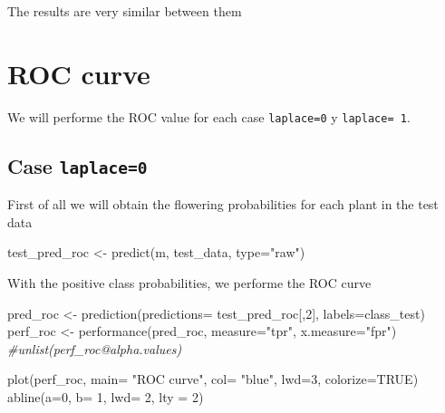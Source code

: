 \documentclass[
]{article}
\newenvironment{Shaded}{\begin{snugshade}}{\end{snugshade}}
\newcommand{\AttributeTok}[1]{\textcolor[rgb]{0.77,0.63,0.00}{#1}}
\newcommand{\CommentTok}[1]{\textcolor[rgb]{0.56,0.35,0.01}{\textit{#1}}}
\newcommand{\ConstantTok}[1]{\textcolor[rgb]{0.00,0.00,0.00}{#1}}
\newcommand{\DecValTok}[1]{\textcolor[rgb]{0.00,0.00,0.81}{#1}}
\newcommand{\FunctionTok}[1]{\textcolor[rgb]{0.00,0.00,0.00}{#1}}
\newcommand{\NormalTok}[1]{#1}
\newcommand{\OtherTok}[1]{\textcolor[rgb]{0.56,0.35,0.01}{#1}}
\newcommand{\StringTok}[1]{\textcolor[rgb]{0.31,0.60,0.02}{#1}}
\begin{document}
The results are very similar between them

\hypertarget{roc-curve}{%
\section{ROC curve}\label{roc-curve}}

We will performe the ROC value for each case \texttt{laplace=0} y
\texttt{laplace=\ 1}.

\hypertarget{case-laplace0}{%
\subsection{\texorpdfstring{Case
\texttt{laplace=0}}{Case laplace=0}}\label{case-laplace0}}

First of all we will obtain the flowering probabilities for each plant
in the test data

\begin{Shaded}
\begin{Highlighting}[]
\NormalTok{test\_pred\_roc }\OtherTok{\textless{}{-}} \FunctionTok{predict}\NormalTok{(m, test\_data, }\AttributeTok{type=}\StringTok{"raw"}\NormalTok{)}
\end{Highlighting}
\end{Shaded}

With the positive class probabilities, we performe the ROC curve

\begin{Shaded}
\begin{Highlighting}[]
\NormalTok{pred\_roc }\OtherTok{\textless{}{-}} \FunctionTok{prediction}\NormalTok{(}\AttributeTok{predictions=}\NormalTok{ test\_pred\_roc[,}\DecValTok{2}\NormalTok{], }\AttributeTok{labels=}\NormalTok{class\_test)}
\NormalTok{perf\_roc }\OtherTok{\textless{}{-}} \FunctionTok{performance}\NormalTok{(pred\_roc, }\AttributeTok{measure=}\StringTok{"tpr"}\NormalTok{, }\AttributeTok{x.measure=}\StringTok{"fpr"}\NormalTok{)}
\CommentTok{\#unlist(perf\_roc@alpha.values)}


\FunctionTok{plot}\NormalTok{(perf\_roc, }\AttributeTok{main=} \StringTok{"ROC curve"}\NormalTok{, }\AttributeTok{col=} \StringTok{"blue"}\NormalTok{, }\AttributeTok{lwd=}\DecValTok{3}\NormalTok{, }\AttributeTok{colorize=}\ConstantTok{TRUE}\NormalTok{)}
\FunctionTok{abline}\NormalTok{(}\AttributeTok{a=}\DecValTok{0}\NormalTok{, }\AttributeTok{b=} \DecValTok{1}\NormalTok{, }\AttributeTok{lwd=} \DecValTok{2}\NormalTok{, }\AttributeTok{lty =} \DecValTok{2}\NormalTok{)}
\end{Highlighting}
\end{Shaded}
\end{document}
